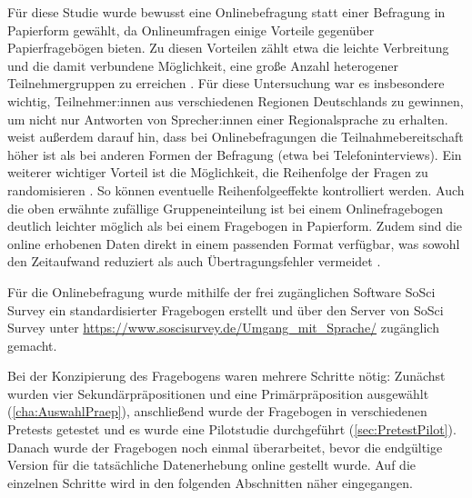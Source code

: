 Für diese Studie wurde bewusst eine Onlinebefragung statt einer Befragung in Papierform gewählt, da Onlineumfragen einige Vorteile gegenüber Papierfragebögen bieten. 
Zu diesen Vorteilen zählt etwa die leichte Verbreitung und die damit verbundene Möglichkeit, eine große Anzahl heterogener Teilnehmergruppen zu erreichen \citep[s.][77]{Potschke2009}. 
Für diese Untersuchung war es insbesondere wichtig, Teilnehmer:innen aus verschiedenen Regionen Deutschlands zu gewinnen, um nicht nur Antworten von Sprecher:innen einer Regionalsprache zu erhalten. 
\citet[78]{Potschke2009} weist außerdem darauf hin, dass bei Onlinebefragungen die Teilnahmebereitschaft höher ist als bei anderen Formen der Befragung (etwa bei Telefoninterviews). 
Ein weiterer wichtiger Vorteil ist die Möglichkeit, die Reihenfolge der Fragen zu randomisieren \citep[s.][109]{Baur2009}. 
So können eventuelle Reihenfolgeeffekte kontrolliert werden. 
Auch die oben erwähnte zufällige Gruppeneinteilung ist bei einem Onlinefragebogen deutlich leichter möglich als bei einem Fragebogen in Papierform. 
Zudem sind die online erhobenen Daten direkt in einem passenden Format verfügbar, was sowohl den Zeitaufwand reduziert als auch Übertragungsfehler vermeidet \citep[s.][77]{Potschke2009}.

Für die Onlinebefragung wurde mithilfe der frei zugänglichen Software SoSci Survey \citep[s.][]{Leiner2014} ein standardisierter Fragebogen erstellt und über den Server von SoSci Survey unter \url{https://www.soscisurvey.de/Umgang\_mit\_Sprache/} zugänglich gemacht.  

Bei der Konzipierung des Fragebogens waren mehrere Schritte nötig: Zunächst wurden vier Sekundärpräpositionen und eine Primärpräposition ausgewählt (\autoref{cha:AuswahlPraep}), anschließend wurde der Fragebogen in verschiedenen Pretests getestet und es wurde eine Pilotstudie durchgeführt (\autoref{sec:PretestPilot}). Danach wurde der Fragebogen noch einmal überarbeitet, bevor die endgültige Version für die tatsächliche Datenerhebung online gestellt wurde. Auf die einzelnen Schritte wird in den folgenden Abschnitten näher eingegangen. 

